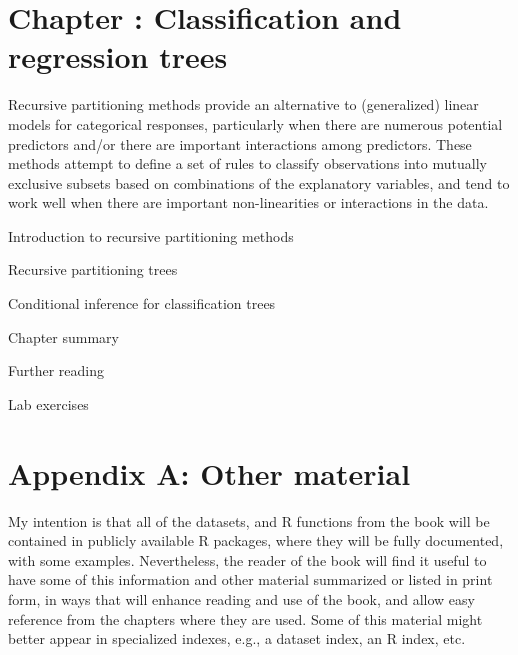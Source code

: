 \documentclass{article}
\newcommand{\Chapter}[1]{\section{Chapter \thesection: #1}}
\newcommand{\Appendix}[2]{\section*{Appendix #1: #2}}
\newcommand{\Section}[1]{\item #1}
\newcommand{\R}{\textsf{R}\xspace}
\newenvironment{proglist}%
 {\begin{list}{}{%
    \settowidth{\labelwidth}{\texttt{PROGRAMSxx}}
	 \setlength{\leftmargin}{\labelwidth}
	 \addtolength{\leftmargin}{\labelsep}
	 \setlength{\parsep}{0.2ex plus0.2ex minus0.2ex}
	 \setlength{\itemsep}{0pt}
	 \renewcommand{\makelabel}[1]{\texttt{##1\hfill}}}}
 {\end{list}}
\begin{document}
\Chapter{Classification and regression trees}\label{ch:trees}

Recursive partitioning methods provide an alternative to (generalized) linear
models for categorical responses, particularly when there are numerous
potential predictors and/or there are important interactions among predictors.
These methods attempt to define a set of rules to classify observations into
mutually exclusive subsets based on combinations of the explanatory variables,
and tend to work well when there are important non-linearities or interactions
in the data.



\begin{enumerate*}
	\item Introduction to recursive partitioning methods
	\item Recursive partitioning trees
	\item Conditional inference for classification trees
  \Section{Chapter summary}
  \Section{Further reading}
  \Section{Lab exercises}
\end{enumerate*}

\Appendix{A}{Other material}
My intention is that all of the datasets, and \R functions from the book will be contained in
publicly available \R packages,
where they will be fully documented, with some examples.
Nevertheless, the reader of the book will find it useful to have some of this information
and other material summarized or listed in print form, in ways that will enhance
reading and use of the book, and allow easy reference from the chapters where they are
used.
Some of this material might better appear in specialized indexes, e.g.,
a dataset index, an \R index, etc.



\end{document}
